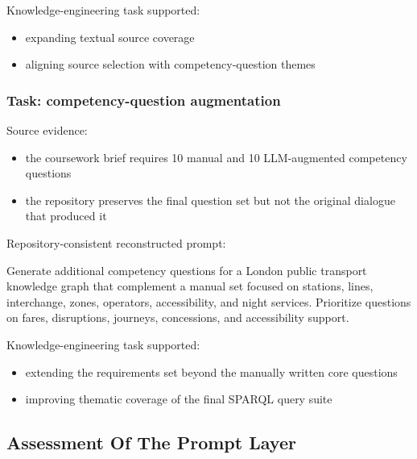 \documentclass[
  11pt,
  a4paper,
]{article}
\newenvironment{Shaded}{}{}
\newcommand{\NormalTok}[1]{#1}
\providecommand{\tightlist}{%
  \setlength{\itemsep}{0pt}\setlength{\parskip}{0pt}}
\begin{document}
Knowledge-engineering task supported:

\begin{itemize}
\tightlist
\item
  expanding textual source coverage
\item
  aligning source selection with competency-question themes
\end{itemize}

\subsubsection{Task: competency-question
augmentation}\label{task-competency-question-augmentation}

Source evidence:

\begin{itemize}
\tightlist
\item
  the coursework brief requires 10 manual and 10 LLM-augmented
  competency questions
\item
  the repository preserves the final question set but not the original
  dialogue that produced it
\end{itemize}

Repository-consistent reconstructed prompt:

\begin{Shaded}
\begin{Highlighting}[]
\NormalTok{Generate additional competency questions for a London public transport knowledge graph that complement a manual set focused on stations, lines, interchange, zones, operators, accessibility, and night services. Prioritize questions on fares, disruptions, journeys, concessions, and accessibility support.}
\end{Highlighting}
\end{Shaded}

Knowledge-engineering task supported:

\begin{itemize}
\tightlist
\item
  extending the requirements set beyond the manually written core
  questions
\item
  improving thematic coverage of the final SPARQL query suite
\end{itemize}

\subsection{Assessment Of The Prompt
Layer}\label{assessment-of-the-prompt-layer}
\end{document}
